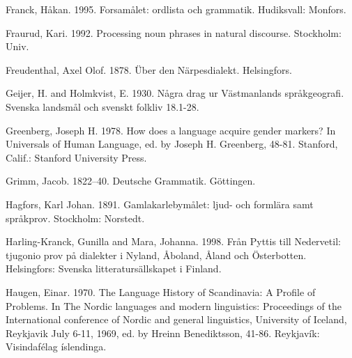 Franck, Håkan. 1995. Forsamålet: ordlista och grammatik. Hudiksvall: Monfors.


Fraurud, Kari. 1992. Processing noun phrases in natural discourse. Stockholm: Univ.


Freudenthal, Axel Olof. 1878. Über den Närpesdialekt. Helsingfors.


Geijer, H. and Holmkvist, E. 1930. Några drag ur Västmanlands språkgeografi. Svenska landsmål och svenskt folkliv 18.1-28.


Greenberg, Joseph H. 1978. How does a language acquire gender markers? In Universals of Human Language, ed. by Joseph H. Greenberg, 48-81. Stanford, Calif.: Stanford University Press.


Grimm, Jacob. 1822–40. Deutsche Grammatik. Göttingen.


Hagfors, Karl Johan. 1891. Gamlakarlebymålet: ljud- och formlära samt språkprov. Stockholm: Norstedt.


Harling-Kranck, Gunilla and Mara, Johanna. 1998. Från Pyttis till Nedervetil: tjugonio prov på dialekter i Nyland, Åboland, Åland och Österbotten. Helsingfors: Svenska litteratursällskapet i Finland.


Haugen, Einar. 1970. The Language History of Scandinavia: A Profile of Problems. In The Nordic languages and modern linguistics: Proceedings of the International conference of Nordic and general linguistics, University of Iceland, Reykjavik July 6-11, 1969, ed. by Hreinn Benediktsson, 41-86. Reykjavík: Visindafélag íslendinga. 



